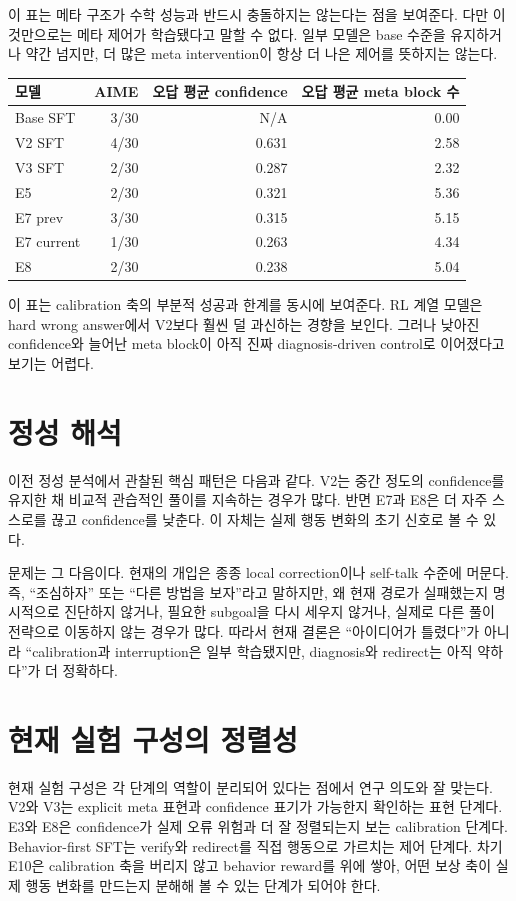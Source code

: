 \documentclass[11pt]{article}
\begin{document}
이 표는 메타 구조가 수학 성능과 반드시 충돌하지는 않는다는 점을 보여준다. 다만 이것만으로는 메타 제어가 학습됐다고 말할 수 없다. 일부 모델은 base 수준을 유지하거나 약간 넘지만, 더 많은 meta intervention이 항상 더 나은 제어를 뜻하지는 않는다.

\begin{center}
\begin{tabular}{lrrr}
\toprule
모델 & AIME & 오답 평균 confidence & 오답 평균 meta block 수 \\
\midrule
Base SFT & 3/30 & N/A & 0.00 \\
V2 SFT & 4/30 & 0.631 & 2.58 \\
V3 SFT & 2/30 & 0.287 & 2.32 \\
E5 & 2/30 & 0.321 & 5.36 \\
E7 prev & 3/30 & 0.315 & 5.15 \\
E7 current & 1/30 & 0.263 & 4.34 \\
E8 & 2/30 & 0.238 & 5.04 \\
\bottomrule
\end{tabular}
\end{center}

이 표는 calibration 축의 부분적 성공과 한계를 동시에 보여준다. RL 계열 모델은 hard wrong answer에서 V2보다 훨씬 덜 과신하는 경향을 보인다. 그러나 낮아진 confidence와 늘어난 meta block이 아직 진짜 diagnosis-driven control로 이어졌다고 보기는 어렵다.

\section*{정성 해석}
이전 정성 분석에서 관찰된 핵심 패턴은 다음과 같다. V2는 중간 정도의 confidence를 유지한 채 비교적 관습적인 풀이를 지속하는 경우가 많다. 반면 E7과 E8은 더 자주 스스로를 끊고 confidence를 낮춘다. 이 자체는 실제 행동 변화의 초기 신호로 볼 수 있다.

문제는 그 다음이다. 현재의 개입은 종종 local correction이나 self-talk 수준에 머문다. 즉, ``조심하자'' 또는 ``다른 방법을 보자''라고 말하지만, 왜 현재 경로가 실패했는지 명시적으로 진단하지 않거나, 필요한 subgoal을 다시 세우지 않거나, 실제로 다른 풀이 전략으로 이동하지 않는 경우가 많다. 따라서 현재 결론은 ``아이디어가 틀렸다''가 아니라 ``calibration과 interruption은 일부 학습됐지만, diagnosis와 redirect는 아직 약하다''가 더 정확하다.

\section*{현재 실험 구성의 정렬성}
현재 실험 구성은 각 단계의 역할이 분리되어 있다는 점에서 연구 의도와 잘 맞는다. V2와 V3는 explicit meta 표현과 confidence 표기가 가능한지 확인하는 표현 단계다. E3와 E8은 confidence가 실제 오류 위험과 더 잘 정렬되는지 보는 calibration 단계다. Behavior-first SFT는 verify와 redirect를 직접 행동으로 가르치는 제어 단계다. 차기 E10은 calibration 축을 버리지 않고 behavior reward를 위에 쌓아, 어떤 보상 축이 실제 행동 변화를 만드는지 분해해 볼 수 있는 단계가 되어야 한다.
\end{document}
